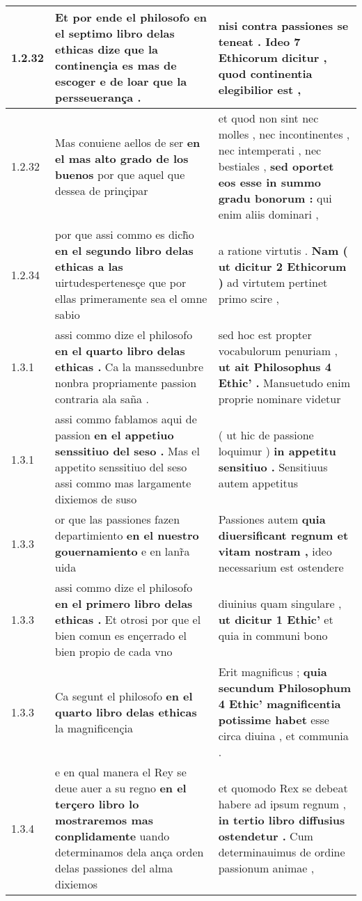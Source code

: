 \begin{tabular}{|p{1cm}|p{6.5cm}|p{6.5cm}|}
1.2.32 & Et por ende el philosofo \textbf{ en el septimo libro delas ethicas dize } que la continençia es mas de escoger e de loar que la persseuerança . & nisi contra passiones se teneat . \textbf{ Ideo 7 Ethicorum dicitur , } quod continentia elegibilior est , \\\hline
1.2.32 & Mas conuiene aellos de ser \textbf{ en el mas alto grado de los buenos } por que aquel que dessea de prinçipar & et quod non sint nec molles , nec incontinentes , nec intemperati , nec bestiales , \textbf{ sed oportet eos esse in summo gradu bonorum : } qui enim aliis dominari , \\\hline
1.2.34 & por que assi commo es dich̃o \textbf{ en el segundo libro delas ethicas a las } uirtudespertenesçe que por ellas primeramente sea el omne sabio & a ratione virtutis . \textbf{ Nam ( ut dicitur 2 Ethicorum ) } ad virtutem pertinet primo scire , \\\hline
1.3.1 & assi commo dize el philosofo \textbf{ en el quarto libro delas ethicas . } Ca la manssedunbre nonbra propriamente passion contraria ala saña . & sed hoc est propter vocabulorum penuriam , \textbf{ ut ait Philosophus 4 Ethic’ . } Mansuetudo enim proprie nominare videtur \\\hline
1.3.1 & assi commo fablamos aqui de passion \textbf{ en el appetiuo senssitiuo del seso . } Mas el appetito senssitiuo del seso assi commo mas largamente dixiemos de suso & ( ut hic de passione loquimur ) \textbf{ in appetitu sensitiuo . } Sensitiuus autem appetitus \\\hline
1.3.3 & or que las passiones fazen departimiento \textbf{ en el nuestro gouernamiento } e en lanr̃a uida & Passiones autem \textbf{ quia diuersificant regnum et vitam nostram , } ideo necessarium est ostendere \\\hline
1.3.3 & assi commo dize el philosofo \textbf{ en el primero libro delas ethicas . } Et otrosi por que el bien comun es ençerrado el bien propio de cada vno & diuinius quam singulare , \textbf{ ut dicitur 1 Ethic’ } et quia in communi bono \\\hline
1.3.3 & Ca segunt el philosofo \textbf{ en el quarto libro delas ethicas } la magnificençia & Erit magnificus ; \textbf{ quia secundum Philosophum 4 Ethic’ magnificentia potissime habet } esse circa diuina , et communia . \\\hline
1.3.4 & e en qual manera el Rey se deue auer a su regno \textbf{ en el terçero libro lo mostraremos mas conplidamente } uando determinamos dela ança orden delas passiones del alma dixiemos & et quomodo Rex se debeat habere ad ipsum regnum , \textbf{ in tertio libro diffusius ostendetur . } Cum determinauimus de ordine passionum animae , \\\hline

\end{tabular}
